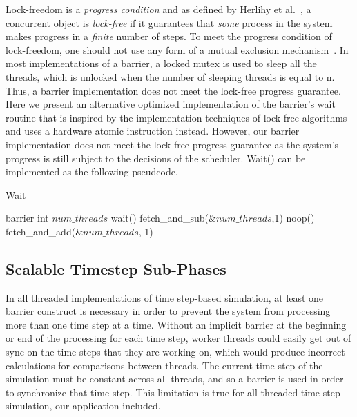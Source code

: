 \documentclass[CEJCS,PDF]{cej} %
\begin{document}
Lock-freedom is a \emph{progress condition} and as defined by Herlihy et al.~\cite{HS08, Shavit11}, a concurrent object is \emph{lock-free} if it guarantees that \emph{some} process in the system makes progress in a \emph{finite} number of steps. To meet the progress condition of lock-freedom, one should not use any form of a mutual exclusion mechanism~\cite{HS08, Dechev06}. In most implementations of a barrier, a locked mutex is used to sleep all the threads, which is 
unlocked when the number of sleeping threads is equal to n. Thus, a barrier implementation does not meet the lock-free progress guarantee.  
Here we present an alternative optimized implementation of the barrier's wait routine that is inspired by the implementation techniques of lock-free algorithms~\cite{Shavit11, Dechev06} and uses a hardware atomic instruction instead. However, our barrier implementation does not meet the lock-free progress guarantee as the system's progress is still subject to the decisions of the scheduler. Wait() can be implemented as the following pseudcode.

\begin{algorithm}
\label{barrier}
\caption{Wait}
\begin{algorithmic}
\STATE barrier
	\STATE int $num\_threads$ 
	\STATE wait()
	\STATE {}
	\STATE fetch\_and\_sub($\&num\_threads$,1)
	\STATE {}
		\STATE noop()
	\ENDWHILE
	\STATE {}
	\STATE fetch\_and\_add($\&num\_threads$, 1)
\end{algorithmic}
\end{algorithm}


\subsection{Scalable Timestep Sub-Phases}
\label{sec:stsp}
In all threaded implementations of time step-based simulation, at least one barrier construct
is necessary in order to prevent the system from processing more than one time step at a time.  Without an implicit barrier at the beginning or end of the 
processing for each time step, worker threads could easily get out of sync on the time steps that they are working on, which would produce incorrect calculations
for comparisons between threads.  The current time step of the simulation must be constant across all threads, and so a barrier is used in order to synchronize that time step.  This
limitation is true for all threaded time step simulation, our application included.
\end{document}
